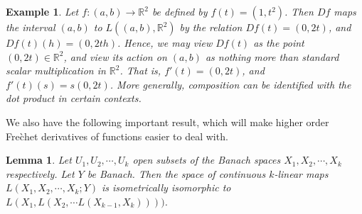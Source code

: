 \documentclass[12pt,reqno]{amsart}
\numberwithin{equation}{section}  %
\newcommand{\rr}{\mathbb{R}}
\newtheorem{lemma}[theorem]{Lemma}
\newtheorem {example}[theorem]{Example}
\begin{document}
\begin{framed}
\begin{example}
Let $f: (a,b) \to \rr^2$ be defined by $f(t) = (1, t^2)$. Then $Df$ maps the
interval $(a,b)$ to $L((a,b), \rr^{2})$ by the relation $Df(t) = (0, 2t)$, and
$Df(t)(h) = (0,2th)$. Hence, we may view $Df(t)$ as the point $(0,2t) \in
\rr^2$, and view its action on $(a,b)$ as nothing more than standard scalar
multiplication in $\rr^{2}$. That is, $f'(t) = (0,2t)$, and $f'(t)(s) = s(0,
2t)$. More generally, composition can be \emph{identified} with the dot product in certain contexts. 
\end{example}
\end{framed}
We also have the following important result, which will make higher order
Fre\`chet derivatives of functions easier to deal with.
%
%
%
%
%
%
%
%
\begin{lemma}
    Let $U_{1}, U_{2}, \cdots,
    U_{k}$ open subsets of the Banach spaces $X_{1}, X_{2}, \cdots, X_{k}$
    respectively. Let $Y$ be Banach. 
    Then the space of continuous $k$-linear maps $L(X_{1}, X_{2}, \cdots, X_{k};
    Y)$ is isometrically isomorphic to $L(X_{1}, L(X_{2}, \cdots L(X_{k-1},
    X_{k}))))$.
\label{lem:iso}
\end{lemma}
%
%
%
\end{document}
